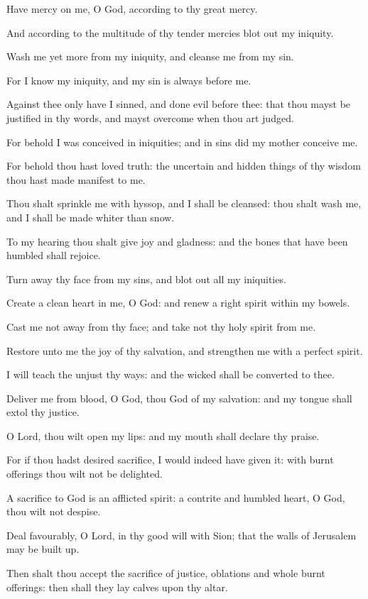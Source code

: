 ﻿\item Have mercy on me, O God, according to thy great mercy.
\item And according to the multitude of thy tender mercies blot out my iniquity.
\item Wash me yet more from my iniquity, and cleanse me from my sin.
\item For I know my iniquity, and my sin is always before me.
\item Against thee only have I sinned, and done evil before thee: that thou mayst be justified in thy words, and mayst overcome when thou art judged.
\item For behold I was conceived in iniquities; and in sins did my mother conceive me.
\item For behold thou hast loved truth: the uncertain and hidden things of thy wisdom thou hast made manifest to me.
\item Thou shalt sprinkle me with hyssop, and I shall be cleansed: thou shalt wash me, and I shall be made whiter than snow.
\item To my hearing thou shalt give joy and gladness: and the bones that have been humbled shall rejoice.
\item Turn away thy face from my sins, and blot out all my iniquities.
\item Create a clean heart in me, O God: and renew a right spirit within my bowels.
\item Cast me not away from thy face; and take not thy holy spirit from me.
\item Restore unto me the joy of thy salvation, and strengthen me with a perfect spirit.
\item I will teach the unjust thy ways: and the wicked shall be converted to thee.
\item Deliver me from blood, O God, thou God of my salvation: and my tongue shall extol thy justice.
\item O Lord, thou wilt open my lips: and my mouth shall declare thy praise.
\item For if thou hadst desired sacrifice, I would indeed have given it: with burnt offerings thou wilt not be delighted.
\item A sacrifice to God is an afflicted spirit: a contrite and humbled heart, O God, thou wilt not despise.
\item Deal favourably, O Lord, in thy good will with Sion; that the walls of Jerusalem may be built up.
\item Then shalt thou accept the sacrifice of justice, oblations and whole burnt offerings: then shall they lay calves upon thy altar.